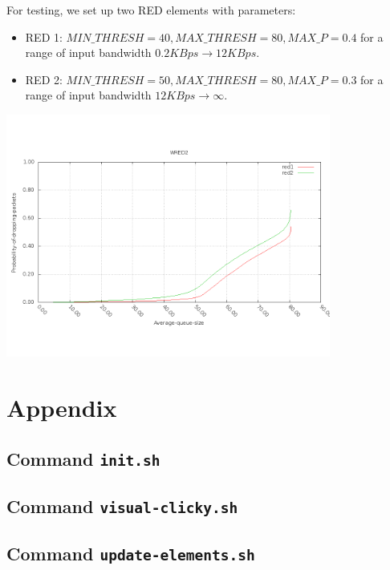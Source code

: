 \documentclass[a4paper]{article}
\begin{document}
  For testing, we set up two RED elements with parameters:
  \begin{itemize}
  	\item RED 1: $MIN\_THRESH = 40, MAX\_THRESH = 80, MAX\_P = 0.4$ for a range of input bandwidth $0.2KBps \to 12KBps$.
  	\item RED 2: $MIN\_THRESH = 50, MAX\_THRESH = 80, MAX\_P = 0.3$ for a range of input bandwidth $12KBps \to \infty$.
  \end{itemize}
  \begin{center}
	\includegraphics[width=0.80\textwidth]{wred2.png}
	\label{fig:test-wred2}
  \end{center}
  \newpage
  \appendix
  \section{Appendix}

  \subsection{Command \texttt{init.sh}}
  

  \subsection{Command \texttt{visual-clicky.sh}}
  

  \subsection{Command \texttt{update-elements.sh}}
  
  
\end{document}
